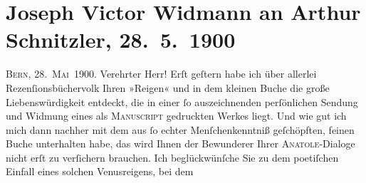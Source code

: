 

         
         \renewcommand{\erwaehntePersonen}{Personen: Joseph Victor Widmann}
         \renewcommand{\erwaehnteOrte}{Orte: Bern, Pompei, Wien}
         \renewcommand{\erwaehnteWerke}{Werke: Anatol, Kunst und Litteratur, Reigen. Zehn Dialoge}
               \section[Joseph Victor Widmann an Arthur Schnitzler, 28. 5. 1900]{ Joseph Victor Widmann an Arthur Schnitzler, 28. 5. 1900}\nopagebreak{}\rehead{ }\begin{ledgroupsized}[t]{13cm}\normalsize\beginnumbering{} \toendnotes[C]{\smallbreak\pagebreak[2]} 
\toendnotes[C]{\smallbreak}\pstart
           \raggedleft{}{\pb}\textsc{Bern, 28. Mai 1900}.\pend
           \pstart{}Verehrter Herr!\pend\pstart
           Erſt geſtern habe ich über allerlei Rezenſionsbüchervolk Ihren »Reigen« und in dem kleinen Buche die große Liebenswürdigkeit
               entdeckt, die in einer ſo auszeichnenden perſönlichen {\pb}Sendung und Widmung
               eines als \textsc{Manuscript} gedruckten Werkes liegt.\pend
           \pstart
           Und wie gut ich mich dann nachher mit dem aus ſo echter Menſchenkenntniß geſchöpften,
               feinen Buche unterhalten habe, das wird Ihnen der Bewunderer Ihrer \textsc{Anatole}-Dialoge nicht erſt zu verſichern brauchen.\pend
           \pstart
           Ich beglückwünſche Sie zu dem poetiſchen Einfall eines solchen Venusreigens, bei dem

\end{ledgroupsized}
